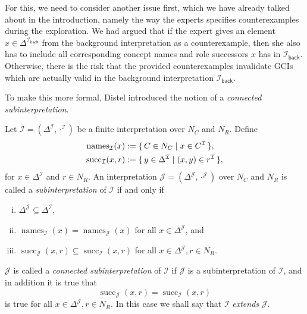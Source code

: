 For this, we need to consider another issue first, which we have already talked about in
the introduction, namely the way the experts specifies counterexamples during the
exploration.  We had argued that if the expert gives an element $x \in
\Delta^{\mathcal{I}_{\mathsf{back}}}$ from the background interpretation as a
counterexample, then she also has to include all corresponding concept names and role
successors $x$ has in $\mathcal{I}_{\mathsf{back}}$.  Otherwise, there is the risk that
the provided counterexamples invalidate GCIs which are actually valid in the background
interpretation $\mathcal{I}_{\mathsf{back}}$.

To make this more formal, Distel introduced the notion of a \emph{connected
  subinterpretation}.

\begin{Definition}
  \label{def:connected-subinterpretations}
  Let $\mathcal{I} = (\Delta^{\mathcal{I}}, \cdot^{\mathcal{I}})$ be a finite
  interpretation over $N_{C}$ and $N_{R}$.  Define%
  \def\succop{\operatorname{succ}}%
  \def\nameop{\operatorname{names}}%
  \begin{align*}
    \nameop_{\mathcal{I}}(x) &:= \set{ C \in N_{C} \mid x \in C^{\mathcal{I}} },\\
    \succop_{\mathcal{I}}(x, r) &:= \set{ y \in \Delta^{\mathcal{I}} \mid (x, y) \in
      r^{\mathcal{I}} },
  \end{align*}
  for $x \in \Delta^{\mathcal{I}}$ and $r \in N_{R}$.  An interpretation $\mathcal{J} =
  (\Delta^{\mathcal{J}}, \cdot^{\mathcal{J}})$ over $N_{C}$ and $N_{R}$ is called a
  \emph{subinterpretation} of $\mathcal{I}$ if and only if
  \begin{enumerate}[i. ]
  \item $\Delta^{\mathcal{J}} \subseteq \Delta^{\mathcal{I}}$,
  \item $\nameop_{\mathcal{I}}(x) = \nameop_{\mathcal{J}}(x)$ for all $x \in
    \Delta^{\mathcal{J}}$, and
  \item $\succop_{\mathcal{J}}(x,r) \subseteq \succop_{\mathcal{I}}(x,r)$ for all $x \in
    \Delta^{\mathcal{J}}, r \in N_{R}$.
  \end{enumerate}
  $\mathcal{J}$ is called a \emph{connected subinterpretation} of $\mathcal{I}$ if
  $\mathcal{J}$ is a subinterpretation of $\mathcal{I}$, and in addition it is true that
  \begin{equation*}
    \succop_{\mathcal{J}}(x, r) = \succop_{\mathcal{I}}(x, r)
  \end{equation*}
  is true for all $x \in \Delta^{\mathcal{J}}, r \in N_{R}$.  In this case we shall say
  that $\mathcal{I}$ \emph{extends} $\mathcal{J}$.
\end{Definition}

